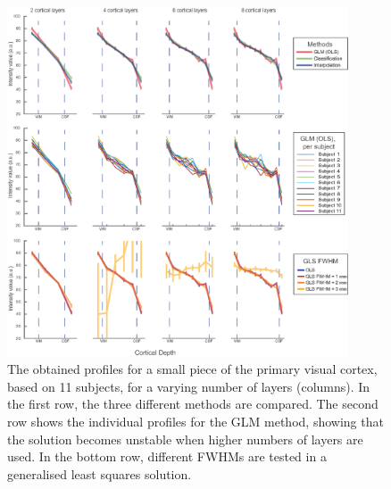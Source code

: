\begin{figure}[ht]
	\centering
	\includegraphics[width=0.9\textwidth, clip=true]{./Chapters/03_GLM/./Images/ProfileComparisons}
	\caption{The obtained profiles for a small piece of the primary visual cortex, based on 11 subjects, for a varying number of layers (columns). In the first row, the three different methods are compared. The second row shows the individual profiles for the GLM method, showing that the solution becomes unstable when higher numbers of layers are used. In the bottom row, different FWHMs are tested in a generalised least squares solution.}
	\label{fig:profileaverage}
\end{figure}